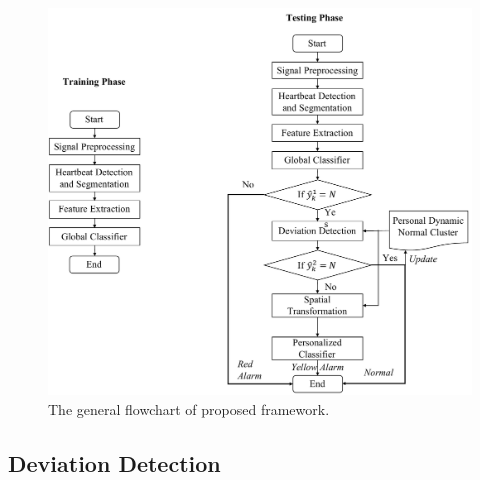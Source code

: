 \begin{figure}[ht]
	\centering
	\includegraphics[scale=.5]{Fig/flow_thesis.pdf}
	\caption{The general flowchart of proposed framework.}
	\label{fig:flow}
\end{figure}


\subsection{Deviation Detection}\label{sec:dev_detec}

